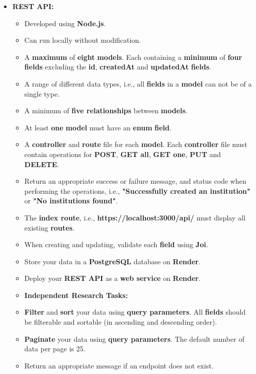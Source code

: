 \documentclass{article}
\begin{document}
\begin{itemize} 
	\item \textbf{REST API:}
	\begin{itemize}
	\item Developed using \textbf{Node.js}.
	\item Can run locally without modification.
	\item A \textbf{maximum} of \textbf{eight} \textbf{models}. Each containing a \textbf{minimum} of \textbf{four} \textbf{fields} excluding the \textbf{id}, \textbf{createdAt} and \textbf{updatedAt} \textbf{fields}.
	\item A range of different data types, i.e., all \textbf{fields} in a \textbf{model} can not be of a single type.
	\item A minimum of \textbf{five relationships} between \textbf{models}.
	\item At least \textbf{one} \textbf{model} must have an \textbf{enum} \textbf{field}. 
	\item A \textbf{controller} and \textbf{route} file for each \textbf{model}. Each \textbf{controller} file must contain operations for \textbf{POST}, \textbf{GET all}, \textbf{GET one}, \textbf{PUT} and \textbf{DELETE}.
	\item Return an appropriate success or failure message, and status code when performing the operations, i.e., \textbf{"Successfully created an institution"} or \textbf{"No institutions found"}.
	\item The \textbf{index route}, i.e., \textbf{https://localhost:3000/api/} must display all existing \textbf{routes}.
	\item When creating and updating, validate each \textbf{field} using \textbf{Joi}. 
	\item Store your data in a \textbf{PostgreSQL} database on \textbf{Render}.
	\item Deploy your \textbf{REST API} as a \textbf{web service} on \textbf{Render}.
	\item \textbf{Independent Research Tasks:} 
	\end{itemize}
	\begin{itemize}
		\item \textbf{Filter} and \textbf{sort} your data using \textbf{query parameters}. All \textbf{fields} should be filterable and sortable (in ascending and descending order).
		\item \textbf{Paginate} your data using \textbf{query parameters}. The default number of data per page is 25.
		\item Return an appropriate message if an endpoint does not exist.

\end{itemize}
\end{itemize}
\end{document}
